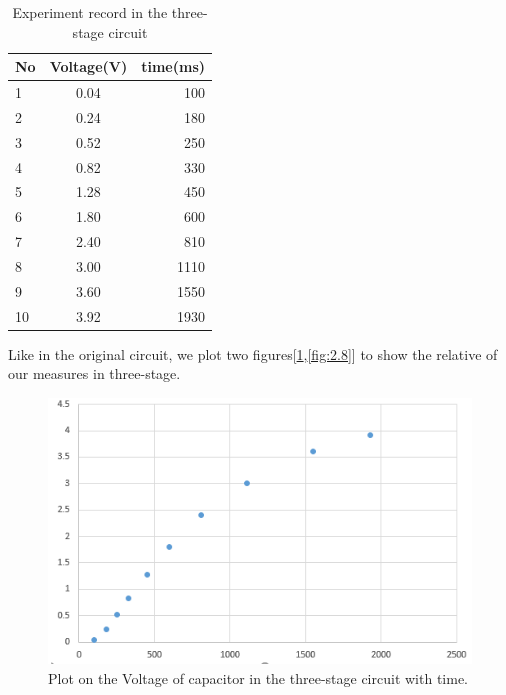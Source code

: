\begin{table}[!htbp]\centering
	\caption{Experiment record in the three-stage circuit}
	\renewcommand\arraystretch{1.5}
	\begin{tabular}{lcr}
		\toprule
		No		&Voltage(V)	&time(ms)	\\
		\midrule
		1		&0.04		&100		\\
		
		2		&0.24		&180		\\
		
		3		&0.52		&250		\\
		
		4		&0.82		&330		\\
		
		5		&1.28		&450		\\
		
		6		&1.80		&600		\\
		
		7		&2.40		&810		\\
		
		8		&3.00		&1110		\\
		
		9		&3.60		&1550		\\
		
		10		&3.92		&1930		\\
		\bottomrule
	\end{tabular}
\end{table}
\phantom{ } Like in the original circuit, we plot two figures[\ref{fig:2.7},\ref{fig:2.8}] to show the relative of our measures in three-stage.
\begin{figure}[!htbp]
	\centering %
	\includegraphics[width=\linewidth]{images/2_7.PNG} %
	\caption{Plot on the Voltage of capacitor in the three-stage circuit with time.} %
	\label{fig:2.7} %
\end{figure}

